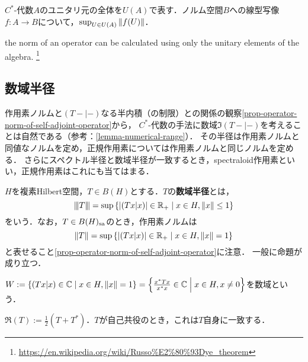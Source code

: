 \documentclass[uplatex,dvipdfmx]{jsreport}
\begin{document}
\begin{corollary}[同じ論文で紹介されている系]
    $C^*$-代数$A$のユニタリ元の全体を$U(A)$で表す．ノルム空間$B$への線型写像$f:A\to B$について，$\sup_{U\in U(A)}\|f(U)\|$．
\end{corollary}
\begin{remarks}
    the norm of an operator can be calculated using only the unitary elements of the algebra. \footnote{\url{https://en.wikipedia.org/wiki/Russo\%E2\%80\%93Dye_theorem}}
\end{remarks}

\subsection{数域半径}

\begin{tcolorbox}[colframe=ForestGreen, colback=ForestGreen!10!white,breakable,colbacktitle=ForestGreen!40!white,coltitle=black,fonttitle=\bfseries\sffamily,
title=]
    作用素ノルムと$(T-|-)$なる半内積（の制限）との関係の観察\ref{prop-operator-norm-of-self-adjoint-operator}から，
    $C^*$-代数の手法に数域$\Im(T-|-)$を考えることは自然である（参考：\ref{lemma-numerical-range}）．
    その半径は作用素ノルムと同値なノルムを定め，正規作用素については作用素ノルムと同じノルムを定める．
    さらにスペクトル半径と数域半径が一致するとき，spectraloid作用素といい，正規作用素はこれにも当てはまる．
\end{tcolorbox}

\begin{definition}
    $H$を複素Hilbert空間，$T\in B(H)$とする．$T$の\textbf{数域半径}とは，
    \[{\left\vert\kern-0.25ex\left\vert\kern-0.25ex\left\vert T \right\vert\kern-0.25ex\right\vert\kern-0.25ex\right\vert}=\sup\left\{\lvert(Tx|x)\rvert\in\mathbb{R}_+\mid x\in H,\|x\|\le 1\right\}\]
    をいう．なお，$T\in B(H)_{\mathrm{sa}}$のとき，作用素ノルムは
    \[\|T\|=\sup\left\{\lvert(Tx|x)\rvert\in\mathbb{R}_+\mid x\in H,\|x\|=1\right\}\]
    と表せること\ref{prop-operator-norm-of-self-adjoint-operator}に注意．
    一般に命題が成り立つ．
\end{definition}
\begin{remark}
    $W:=\left\{(Tx|x)\in\mathbb{C}\mid x\in H,\|x\|= 1\right\}=\left\{\frac{x^*Tx}{x^*x}\in\mathbb{C}\;\middle|\;x\in H,x\ne 0\right\}$を数域という．
\end{remark}

\begin{notation}[自己共役部分]
    $\Re(T):=\frac{1}{2}(T+T^*)$．$T$が自己共役のとき，これは$T$自身に一致する．
\end{notation}
\end{document}
